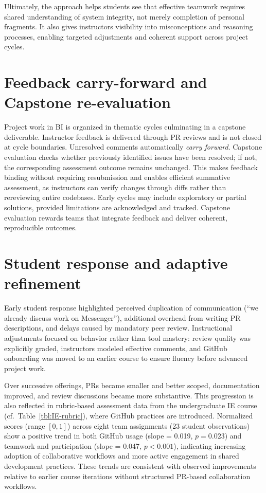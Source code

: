 Ultimately, the approach helps students see that effective teamwork requires shared understanding of system integrity, not merely completion of personal fragments. It also gives instructors visibility into misconceptions and reasoning processes, enabling targeted adjustments and coherent support across project cycles.


\section{Feedback carry-forward and Capstone re-evaluation}

Project work in BI is organized in thematic cycles culminating in a capstone deliverable. Instructor feedback is delivered through PR reviews and is not closed at cycle boundaries. Unresolved comments automatically \emph{carry forward}. Capstone evaluation checks whether previously identified issues have been resolved; if not, the corresponding assessment outcome remains unchanged. This makes feedback binding without requiring resubmission and enables efficient summative assessment, as instructors can verify changes through diffs rather than rereviewing entire codebases.
Early cycles may include exploratory or partial solutions, provided limitations are acknowledged and tracked. Capstone evaluation rewards teams that integrate feedback and deliver coherent, reproducible outcomes.

\section{Student response and adaptive refinement}

Early student response highlighted perceived duplication of communication (``we already discuss work on Messenger''), additional overhead from writing PR descriptions, and delays caused by mandatory peer review. Instructional adjustments focused on behavior rather than tool mastery: review quality was explicitly graded, instructors modeled effective comments, and GitHub onboarding was moved to an earlier course to ensure fluency before advanced project work.

Over successive offerings, PRs became smaller and better scoped, documentation improved, and review discussions became more substantive. This progression is also reflected in rubric-based assessment data from the undergraduate IE course (cf.~Table~\ref{tbl:IE-rubric}), where GitHub practices are introduced. Normalized scores (range $[0,1]$) across eight team assignments (23 student observations) show a positive trend in both GitHub usage (slope = 0.019, $p = 0.023$) and teamwork and participation (slope = 0.047, $p < 0.001$), indicating increasing adoption of collaborative workflows and more active engagement in shared development practices.
These trends are consistent with observed improvements relative to earlier course iterations without structured PR-based collaboration workflows.

